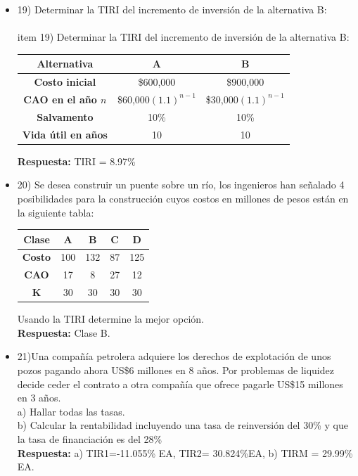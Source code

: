 \begin{itemize}
\item 19) Determinar la TIRI del incremento de inversión de la alternativa B: \\
    \\item 19) Determinar la TIRI del incremento de inversión de la alternativa B: \\
    \begin{center}
        \begin{tabular}{|c|c|c|}
            \hline
            \textbf{Alternativa} & \textbf{A} & \textbf{B} \\ \hline
            \textbf{Costo inicial} & \$600,000 & \$900,000 \\ \hline
            \textbf{CAO en el año \(n\)} & \$60,000\((1.1)^{n-1}\) & \$30,000\((1.1)^{n-1}\) \\ \hline
            \textbf{Salvamento} & 10\% & 10\% \\ \hline
            \textbf{Vida útil en años} & 10 & 10 \\ \hline
        \end{tabular}
    \end{center}
    \textbf{Respuesta:} TIRI = 8.97\%
	      \medskip
	      
	 \item 20) Se desea construir un puente sobre un río, los ingenieros han señalado 4 posibilidades para la construcción cuyos costos en millones de pesos están en la siguiente tabla:\\
    \begin{center}
        \begin{tabular}{|c|c|c|c|c|}
            \hline
            \textbf{Clase} & \textbf{A} & \textbf{B} & \textbf{C} & \textbf{D} \\ \hline
            \textbf{Costo} & 100 & 132 & 87 & 125 \\ \hline
            \textbf{CAO} & 17 & 8 & 27 & 12 \\ \hline
            \textbf{K} & 30 & 30 & 30 & 30 \\ \hline
        \end{tabular}
    \end{center}
    Usando la TIRI determine la mejor opción.\\
    \textbf{Respuesta: } Clase B.
	      \medskip
	      
	\item 21)Una compañía petrolera adquiere los derechos de explotación de unos pozos pagando ahora US\$6 millones en 8 años. Por problemas de liquidez decide ceder el contrato a otra compañía que ofrece pagarle US\$15 millones en 3 años.\\
	      a) Hallar todas las tasas.\\
	      b) Calcular la rentabilidad incluyendo una tasa de reinversión del 30\% y que la tasa de financiación es del 28\%\\
	      \textbf{Respuesta:} a) TIR1=-11.055\% EA, TIR2= 30.824\%EA, b) TIRM = 29.99\% EA.
	      \medskip
	      

\end{itemize}
